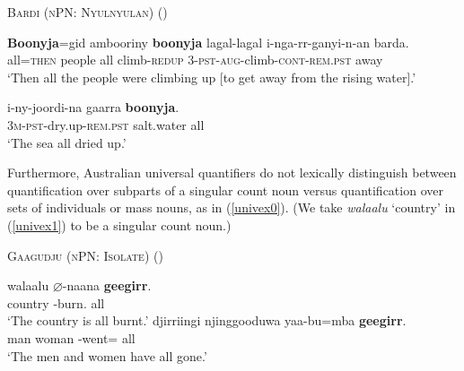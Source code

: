 \documentclass[12pt,egregdoesnotlikesansseriftitles]{scrartcl}
\begin{document}
\begin{exe}
\ex  \textsc{Bardi (nPN: Nyulnyulan)} (\citealt{bowern12}) \label{univmasscount1}
\begin{xlist}
\ex %
\gll \textbf{Boonyja}=gid ambooriny \textbf{boonyja} lagal-lagal   i-nga-rr-ganyi-n-an barda.\\
all=\textsc{then} people all climb-\textsc{redup}  3-\textsc{pst-aug}-climb-\textsc{cont-rem.pst} away\\
`Then all the people were climbing up [to get away from the rising water].'\label{univmasscount2}

\ex \gll i-ny-joordi-na gaarra \textbf{boonyja}.\\
3\textsc{m-pst}-dry.up-\textsc{rem.pst} salt.water all\\
`The sea all dried up.'\label{univmasscount3} %
\end{xlist}
\end{exe}


Furthermore,  Australian universal quantifiers do not lexically distinguish between quantification  over subparts of a singular count noun versus quantification over sets of individuals or mass nouns, as in (\ref{univex0}). (We take \textit{walaalu} `country' in (\ref{univex1}) to be a singular count noun.)


\begin{exe}
 \ex \textsc{Gaagudju (nPN: Isolate)} (\citealt[307]{harvey92}) \label{univex0}
  \begin{xlist}
      \ex \gll walaalu $\varnothing$-naana \textbf{geegirr}.\\
    country \Cliv-burn.\Pp{} all\\
    \glt `The country is all burnt.' \label{univex1}
    \ex \gll djirriingi njinggooduwa yaa-bu=mba \textbf{geegirr}.\\
    man woman \Third\Cli-went=\Aug{} all\\
    \glt `The men and women have all gone.' \label{univex2}
  \end{xlist}
\end{exe}
\end{document}
